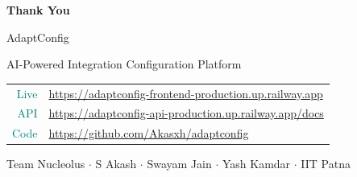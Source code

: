 \documentclass[aspectratio=169,11pt]{beamer}
\begin{document}
\begin{frame}[plain]
\begin{center}
\vspace{1.5cm}
{\Huge\bfseries Thank You}

\vspace{0.6em}
{\Large\color{teal} AdaptConfig}

\vspace{0.2em}
{\color{ts} AI-Powered Integration Configuration Platform}

\vspace{1.2em}

{\small
\begin{tabular}{rl}
\textcolor{teal}{Live} & \url{https://adaptconfig-frontend-production.up.railway.app} \\[3pt]
\textcolor{teal}{API} & \url{https://adaptconfig-api-production.up.railway.app/docs} \\[3pt]
\textcolor{teal}{Code} & \url{https://github.com/Akasxh/adaptconfig} \\
\end{tabular}
}

\vspace{0.8em}
{\small\color{ts} Team Nucleolus $\cdot$ S Akash $\cdot$ Swayam Jain $\cdot$ Yash Kamdar $\cdot$ IIT Patna}
\end{center}
\end{frame}
\end{document}
